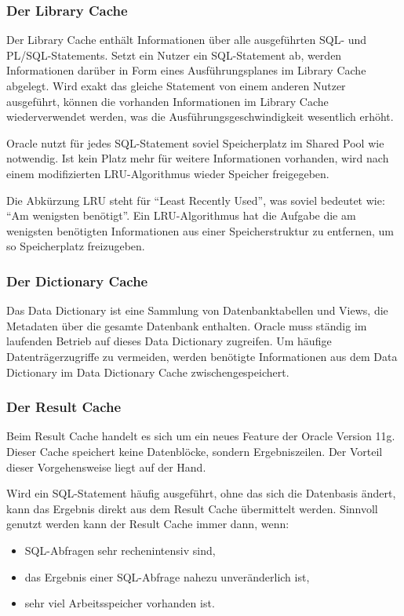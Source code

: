         \subsubsection{Der Library Cache}
          Der Library Cache enthält Informationen über alle ausgeführten
          SQL- und PL/SQL-Statements. Setzt ein Nutzer ein SQL-Statement ab,
          werden Informationen darüber in Form eines Ausführungsplanes im
          Library Cache abgelegt. Wird exakt das gleiche Statement von einem
          anderen Nutzer ausgeführt, können die vorhanden Informationen im
          Library Cache wiederverwendet werden, was die
          Ausführungsgeschwindigkeit wesentlich erhöht.

          Oracle nutzt für jedes SQL-Statement soviel Speicherplatz im Shared
          Pool wie notwendig. Ist kein Platz mehr für weitere Informationen
          vorhanden, wird nach einem modifizierten LRU-Algorithmus wieder
          Speicher freigegeben.

          \begin{merke}
            Die Abkürzung LRU steht für \enquote{Least Recently Used}, was
            soviel bedeutet wie: \enquote{Am wenigsten benötigt}. Ein
            LRU-Algorithmus hat die Aufgabe die am wenigsten benötigten
            Informationen aus einer Speicherstruktur zu entfernen, um so
            Speicherplatz freizugeben.
          \end{merke}
        \subsubsection{Der Dictionary Cache}
          Das Data Dictionary ist eine Sammlung von Datenbanktabellen und Views, die Metadaten über die gesamte Datenbank enthalten. Oracle muss ständig im laufenden Betrieb auf dieses Data Dictionary zugreifen. Um häufige Datenträgerzugriffe zu vermeiden, werden benötigte Informationen aus dem Data Dictionary im Data Dictionary Cache zwischengespeichert.
        \subsubsection{Der Result Cache}
          Beim Result Cache handelt es sich um ein neues Feature der Oracle Version 11g. Dieser Cache speichert keine Datenblöcke, sondern Ergebniszeilen. Der Vorteil dieser Vorgehensweise liegt auf der Hand.

          Wird ein SQL-Statement häufig ausgeführt, ohne das sich die Datenbasis ändert, kann das Ergebnis direkt aus dem Result Cache übermittelt werden. Sinnvoll genutzt werden kann der Result Cache immer dann, wenn:
          \begin{itemize}
            \item SQL-Abfragen sehr rechenintensiv sind,
            \item das Ergebnis einer SQL-Abfrage nahezu unveränderlich ist,
            \item sehr viel Arbeitsspeicher vorhanden ist.
          \end{itemize}
